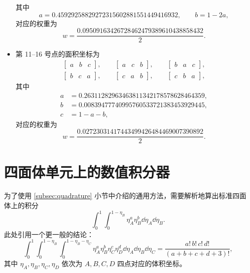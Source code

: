 \begin{itemize}[wide]
\begin{equation}
\end{equation}
其中
\begin{equation}
a=0.45929258829272315602881551449416932,\qquad b=1-2a,
\end{equation}
对应的权重为
\begin{equation}
w=\frac{0.09509163426728462479389610438858432}{2}.
\end{equation}
\item 第 11–16 号点的面积坐标为
\begin{equation}
\begin{gathered}\begin{bmatrix}a & b & c\end{bmatrix},\qquad\begin{bmatrix}a & c & b\end{bmatrix},\qquad\begin{bmatrix}b & a & c\end{bmatrix},\\
\begin{bmatrix}b & c & a\end{bmatrix},\qquad\begin{bmatrix}c & a & b\end{bmatrix},\qquad\begin{bmatrix}c & b & a\end{bmatrix},
\end{gathered}
\end{equation}
其中
\begin{equation}
\begin{aligned}a & =0.26311282963463811342178578628464359,\\
b & =0.00839477740995760533721383453929445,\\
c & =1-a-b,
\end{aligned}
\end{equation}
对应的权重为
\begin{equation}
w=\frac{0.02723031417443499426484469007390892}{2}.
\end{equation}
\end{itemize}
%

\section{四面体单元上的数值积分器}

为了使用 \ref{subsec:quadrature} 小节中介绍的通用方法，需要解析地算出标准四面体上的积分
\begin{equation}
\int_{0}^{1}\int_{0}^{1-\eta_{B}}\eta_{A}^{a}\eta_{B}^{b}\dd{\eta_{A}}\dd{\eta_{B}}.
\end{equation}
此处引用一个更一般的结论：
\begin{equation}
\int_{0}^{1}\int_{0}^{1-\eta_{B}}\int_{0}^{1-\eta_{B}-\eta_{C}}\eta_{A}^{a}\eta_{B}^{b}\eta_{C}^{c}\eta_{D}^{d}\dd{\eta_{A}}\dd{\eta_{B}}\dd{\eta_{C}}=\frac{a!\,b!\,c!\,d!}{(a+b+c+d+3)!},
\end{equation}
其中 $\eta_{A},\eta_{B},\eta_{C},\eta_{D}$ 依次为 $A,B,C,D$ 四点对应的体积坐标。

